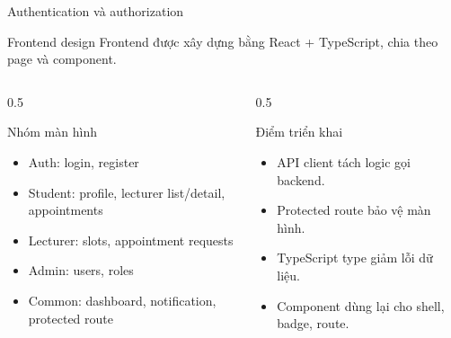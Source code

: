 \documentclass[aspectratio=169,11pt]{beamer}
\begin{document}
\begin{frame}{Authentication và authorization}
  \centering
\end{frame}

\begin{frame}{Frontend design}
  Frontend được xây dựng bằng React + TypeScript, chia theo page và component.

  \begin{columns}[T]
    \begin{column}{0.5\textwidth}
      \begin{block}{Nhóm màn hình}
        \begin{itemize}
          \item Auth: login, register
          \item Student: profile, lecturer list/detail, appointments
          \item Lecturer: slots, appointment requests
          \item Admin: users, roles
          \item Common: dashboard, notification, protected route
        \end{itemize}
      \end{block}
    \end{column}
    \begin{column}{0.5\textwidth}
      \begin{block}{Điểm triển khai}
        \begin{itemize}
          \item API client tách logic gọi backend.
          \item Protected route bảo vệ màn hình.
          \item TypeScript type giảm lỗi dữ liệu.
          \item Component dùng lại cho shell, badge, route.
        \end{itemize}
      \end{block}
    \end{column}
  \end{columns}
\end{frame}
\end{document}
